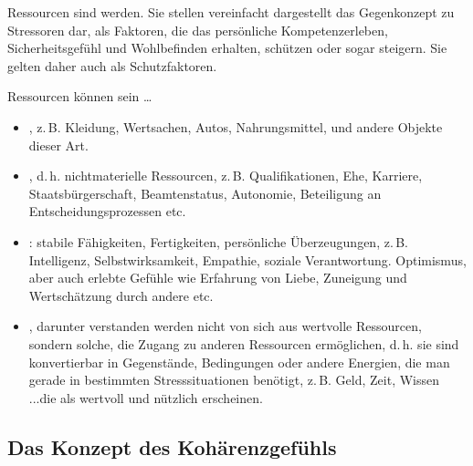 
{Ressourcen sind  werden. Sie stellen
vereinfacht dargestellt das Gegenkonzept zu Stressoren dar,
als Faktoren, die das persönliche Kompetenzerleben,
Sicherheitsgefühl und Wohlbefinden erhalten, schützen oder
sogar steigern. Sie gelten daher auch als Schutzfaktoren.


Ressourcen können sein \ldots
\begin{itemize}
  \item {}, z.\,B. Kleidung, Wertsachen, Autos,
  Nahrungsmittel, und andere Objekte dieser Art.
  \item {}, d.\,h. nichtmaterielle Ressourcen,
  z.\,B. Qualifikationen, Ehe, Karriere, Staatsbürgerschaft,
  Beamtenstatus, Autonomie, Beteiligung an
  Entscheidungsprozessen etc.
  \item {}: stabile Fähigkeiten,
  Fertigkeiten, persönliche Überzeugungen, z.\,B. Intelligenz,
  Selbstwirksamkeit, Empathie, soziale Verantwortung.
  Optimismus, aber auch erlebte Gefühle wie Erfahrung von
  Liebe, Zuneigung und Wertschätzung durch andere etc.
  \item {}, darunter verstanden werden nicht von
  sich aus wertvolle Ressourcen, sondern solche, die Zugang zu
  anderen Ressourcen ermöglichen, d.\,h. sie sind konvertierbar
  in Gegenstände, Bedingungen oder andere Energien, die man
  gerade in bestimmten Stresssituationen benötigt, z.\,B.
  Geld, Zeit, Wissen
  ...die als wertvoll und nützlich erscheinen.
\end{itemize}}
{}
{}
{}
{}




\subsection{Das Konzept des Kohärenzgefühls}

